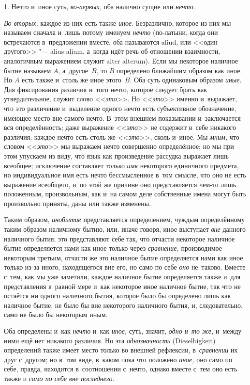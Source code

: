 1. Нечто и~иное суть, {\em во-первых,} оба налично сущие или {\em нечто}.

{\em Во-вторых,} каждое из них есть также {\em иное}. Безразлично, которое из
них мы называем сначала и~лишь потому именуем {\em нечто} (по-латыни, когда они
встречаются в~предложении вместе, оба называются aliud, или <<один другого>>
"--- alius alium, а~когда идёт речь об отношении взаимности, аналогичным
выражением служит alter alterum). Если мы некоторое наличное бытие называем
$A$, а~другое~$B$, то $B$ определено ближайшим образом как иное. Но $A$ есть
также и~столь же иное этого~$B$. Оба суть одинаковым образом {\em иные}. Для
фиксирования различия и~того нечто, которое следует брать как утвердительное,
служит слово <<{\em это}>>. Но <<{\em это}>> именно и~выражает, что это
различение и~выделение одного нечто есть субъективное обозначение, имеющее
место вне самого нечто. В~этом внешнем показывании и~заключается вся
определённость; даже выражение <<{\em это}>> не содержит в~себе никакого
различия; каждое нечто есть столь же <<{\em это}>>, сколь и~иное. Мы
{\em мним,} что словом <<{\em это}>> мы выражаем нечто совершенно определённое;
но мы при этом упускаем из виду, что язык как произведение рассудка выражает
лишь всеобщее; исключение составляет только {\em имя} некоторого единичного
предмета, но индивидуальное имя есть нечто бессмысленное в~том смысле, что оно
не есть выражение всеобщего, и~по этой же причине оно представляется чем-то
лишь положенным, произвольным, как и~на самом деле собственные имена могут быть
произвольно приняты, даны или также изменены.

Таким образом, {\em инобытие} представляется определением, чуждым определённому
таким образом наличному бытию, или, иначе говоря, иное выступает {\em вне}
данного наличного бытия; это представляют себе так, что отчасти некоторое
наличное бытие определяется нами как иное только через {\em сравнение,}
производимое некоторым третьим, отчасти же это наличное бытие определяется нами
как иное только из-за иного, находящегося вне его, но само по себе {\em оно}
не~таково. Вместе с~тем, как мы уже заметили, каждое наличное бытие
определяется также и~для представления в~равной мере и~как некоторое иное
наличное бытие, так что не остаётся ни одного наличного бытия, которое было бы
определено лишь как наличное бытие, не было бы вне некоторого наличного бытия,
и, следовательно, само не было бы некоторым иным.

Оба определены и~как {\em нечто} и~как {\em иное,} суть, значит,
{\em одно и~то же,} и~между ними ещё нет никакого различия. Но эта
{\em однозначность} (Diesel\-bigkeit) определений также имеет место только во
внешней рефлексии, в~{\em сравнении} их друг с~другом; но в~том виде, в~каком
пока что положено {\em иное,} оно само по себе, правда, находится в~соотношении
с~нечто, однако вместе с~тем оно есть также и
{\em само по себе вне последнего}.


